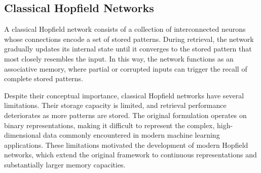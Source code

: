 \subsection{Classical Hopfield Networks}

A classical Hopfield network consists of a collection of interconnected neurons whose connections encode a set of stored patterns. During retrieval, the network gradually updates its internal state until it converges to the stored pattern that most closely resembles the input. In this way, the network functions as an associative memory, where partial or corrupted inputs can trigger the recall of complete stored patterns.

Despite their conceptual importance, classical Hopfield networks have several limitations. Their storage capacity is limited, and retrieval performance deteriorates as more patterns are stored. The original formulation operates on binary representations, making it difficult to represent the complex, high-dimensional data commonly encountered in modern machine learning applications. These limitations motivated the development of modern Hopfield networks, which extend the original framework to continuous representations and substantially larger memory capacities.